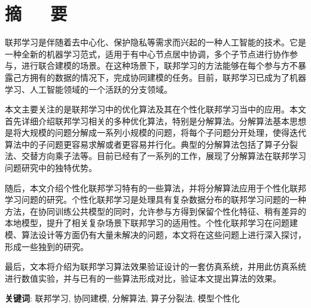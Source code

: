 \chapter*{摘~~~要}
\headheight=15.24pt%

\setcounter{page}{1}


联邦学习是伴随着去中心化、保护隐私等需求而兴起的一种人工智能的技术。它是一种全新的机器学习范式，适用于有中心节点居中协调，多个子节点进行协作参与，进行联合建模的场景。在这种场景下，联邦学习的方法能够在每个参与方不暴露己方拥有的数据的情况下，完成协同建模的任务。目前，联邦学习已成为了机器学习、人工智能领域的一个活跃的分支领域。

本文主要关注的是联邦学习中的优化算法及其在个性化联邦学习当中的应用。本文首先详细介绍联邦学习相关的多种优化算法，特别是分解算法。分解算法基本思想是将大规模的问题分解成一系列小规模的问题，将每个子问题分开处理，使得迭代算法中的子问题更容易求解或者更容易并行化。典型的分解算法包括了算子分裂法、交替方向乘子法等。目前已经有了一系列的工作，展现了分解算法在联邦学习问题研究中的独特优势。

随后，本文介绍个性化联邦学习特有的一些算法，并将分解算法应用于个性化联邦学习问题的研究。个性化联邦学习是处理具有复杂数据分布的联邦学习问题的一种方法，在协同训练公共模型的同时，允许参与方得到保留个性化特征、稍有差异的本地模型，提升了相关复杂场景下联邦学习的适用性。个性化联邦学习在问题建模、算法设计等方面仍有大量未解决的问题，本文将在这些问题上进行深入探讨，形成一些独到的研究。

最后，文本将介绍为联邦学习算法效果验证设计的一套仿真系统，并用此仿真系统进行数值实验，并与已有的一些算法形成对比，验证本文提出算法的效果。

\par
\bigskip

{\song \textbf{关键词}: 联邦学习, 协同建模, 分解算法, 算子分裂法, 模型个性化}

